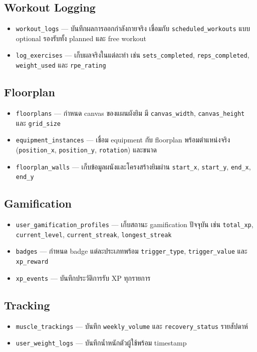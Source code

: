 \subsection{Workout Logging}
\begin{itemize}
  \item \texttt{workout\_logs} — บันทึกผลการออกกำลังกายจริง เชื่อมกับ \texttt{scheduled\_workouts} แบบ optional รองรับทั้ง planned และ free workout
  \item \texttt{log\_exercises} — เก็บผลจริงในแต่ละท่า เช่น \texttt{sets\_completed}, \texttt{reps\_completed}, \texttt{weight\_used} และ \texttt{rpe\_rating}
\end{itemize}

\subsection{Floorplan}
\begin{itemize}
  \item \texttt{floorplans} — กำหนด canvas ของแผนผังยิม มี \texttt{canvas\_width}, \texttt{canvas\_height} และ \texttt{grid\_size}
  \item \texttt{equipment\_instances} — เชื่อม equipment กับ floorplan พร้อมตำแหน่งจริง (\texttt{position\_x}, \texttt{position\_y}, \texttt{rotation}) และขนาด
  \item \texttt{floorplan\_walls} — เก็บข้อมูลผนังและโครงสร้างยิมผ่าน \texttt{start\_x}, \texttt{start\_y}, \texttt{end\_x}, \texttt{end\_y}
\end{itemize}

\subsection{Gamification}
\begin{itemize}
  \item \texttt{user\_gamification\_profiles} — เก็บสถานะ gamification ปัจจุบัน เช่น \texttt{total\_xp}, \texttt{current\_level}, \texttt{current\_streak}, \texttt{longest\_streak}
  \item \texttt{badges} — กำหนด badge แต่ละประเภทพร้อม \texttt{trigger\_type}, \texttt{trigger\_value} และ \texttt{xp\_reward}
  \item \texttt{xp\_events} — บันทึกประวัติการรับ XP ทุกรายการ
\end{itemize}

\subsection{Tracking}
\begin{itemize}
  \item \texttt{muscle\_trackings} — บันทึก \texttt{weekly\_volume} และ \texttt{recovery\_status} รายสัปดาห์
  \item \texttt{user\_weight\_logs} — บันทึกน้ำหนักตัวผู้ใช้พร้อม timestamp
\end{itemize}


